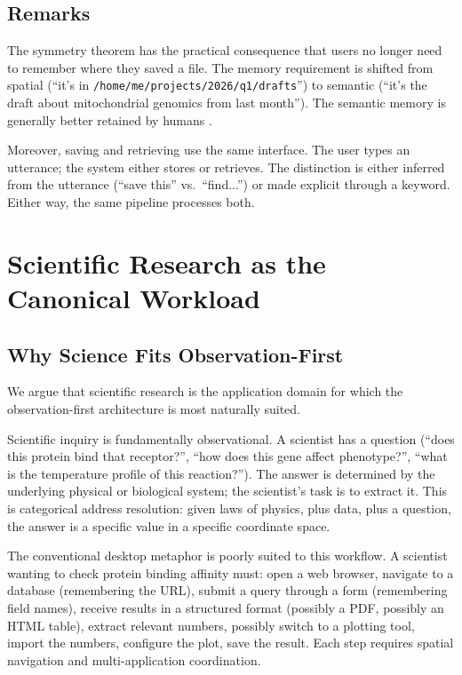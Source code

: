 \documentclass[11pt,twocolumn,a4paper]{article}
\theoremstyle{definition}
\theoremstyle{remark}
\begin{document}
\subsection{Remarks}

The symmetry theorem has the practical consequence that users no longer need to remember where they saved a file. The memory requirement is shifted from spatial (``it's in \texttt{/home/me/projects/2026/q1/drafts}'') to semantic (``it's the draft about mitochondrial genomics from last month''). The semantic memory is generally better retained by humans \citep{tulving1972episodic}.

Moreover, saving and retrieving use the same interface. The user types an utterance; the system either stores or retrieves. The distinction is either inferred from the utterance (``save this'' vs.\ ``find...'') or made explicit through a keyword. Either way, the same pipeline processes both.

\section{Scientific Research as the Canonical Workload}
\label{sec:science}

\subsection{Why Science Fits Observation-First}

We argue that scientific research is the application domain for which the observation-first architecture is most naturally suited.

Scientific inquiry is fundamentally observational. A scientist has a question (``does this protein bind that receptor?'', ``how does this gene affect phenotype?'', ``what is the temperature profile of this reaction?''). The answer is determined by the underlying physical or biological system; the scientist's task is to extract it. This is categorical address resolution: given laws of physics, plus data, plus a question, the answer is a specific value in a specific coordinate space.

The conventional desktop metaphor is poorly suited to this workflow. A scientist wanting to check protein binding affinity must: open a web browser, navigate to a database (remembering the URL), submit a query through a form (remembering field names), receive results in a structured format (possibly a PDF, possibly an HTML table), extract relevant numbers, possibly switch to a plotting tool, import the numbers, configure the plot, save the result. Each step requires spatial navigation and multi-application coordination.
\end{document}
